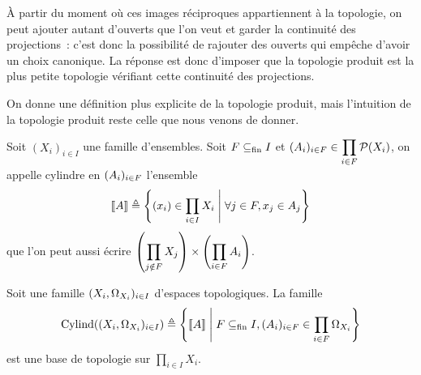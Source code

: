 \`A partir du moment où ces images réciproques appartiennent à la topologie, on
peut ajouter autant d'ouverts que l'on veut et garder la continuité des
projections~: c'est donc la possibilité de rajouter des ouverts qui empêche
d'avoir un choix canonique. La réponse est donc d'imposer que la topologie
produit est la plus petite topologie vérifiant cette continuité des projections.

On donne une définition plus explicite de la topologie produit, mais
l'intuition de la topologie produit reste celle que nous venons de donner.

\begin{definition}[Cylindre]
  Soit $(X_i)_{i\in I}$ une famille d'ensembles. Soit $F\subseteq_{\mathrm{fin}} I$ et
  $\displaystyle (A_i)_{i\in F} \in \prod_{i \in F} \mathcal{P}(X_i)$,
  on appelle cylindre en $(A_i)_{i \in F}$ l'ensemble
  \[\llbracket A\rrbracket \triangleq
  \left\{ (x_i) \in \prod_{i \in I} X_i \;\middle\vert\; \forall j \in F, x_j \in A_j \right\}\]
  que l'on peut aussi écrire
  $\displaystyle\left(\prod_{j\notin F} X_j\right)\times
  \left(\prod_{i\in F} A_i\right)$.
\end{definition}

\begin{property}
  Soit une famille $(X_i,\Omega_{X_i})_{i\in I}$ d'espaces topologiques. La
  famille
  \[\operatorname{Cylind}((X_i,\Omega_{X_i})_{i\in I})\triangleq
  \left\{ \llbracket A\rrbracket \;\middle\vert\; F\subseteq_{\mathrm{fin}} I, (A_i)_{i\in F}\in \prod_{i\in F}\Omega_{X_i} \right\}\]
  est une base de topologie sur $\displaystyle\prod_{i \in I} X_i$.
\end{property}

